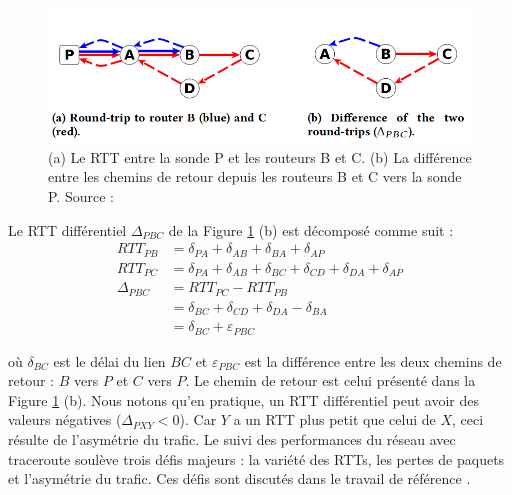 \begin{figure}[h]
	\centering
	\captionsetup{justification= centering}
	\includegraphics[width=0.7\linewidth]{illustrations/rtt-differ}
	\caption{(a) Le RTT entre la sonde P et les routeurs B et C. (b) La différence entre les  chemins de retour depuis les routeurs B et C vers la sonde P. Source : \cite{DBLP:journals/corr/FontugneAPB16}}
	\label{fig:rtt-differ}
\end{figure} 
Le RTT différentiel $ \Delta_{PBC} $ de la Figure 	\ref{fig:rtt-differ} (b) est décomposé comme suit :
\begin{align}
RTT_{PB} & =  \delta_{PA} + \delta_{AB} + \delta_{BA} + \delta_{AP} \nonumber\\
RTT_{PC} & = \delta_{PA} + \delta_{AB} + \delta_{BC} + \delta_{CD} + \delta_{DA}+ \delta_{AP} \nonumber\\
\Delta_{PBC} & = RTT_{PC} - RTT_{PB}  \label{eq:rttdifference}\\ 
& =  \delta_{BC} + \delta_{CD} + \delta_{DA}- \delta_{BA} \nonumber \\
& = \delta_{BC} + \varepsilon_{PBC} \label{eq:rttdiff}
\end{align}

où $\delta_{BC}$ est le délai du lien $BC$ et $\varepsilon_{PBC}$ est la différence entre les deux chemins de retour : $B$ vers $P$ et $C$ vers $P$.  Le chemin de retour est celui  présenté dans  la Figure \ref{fig:rtt-differ} (b). 
Nous notons qu'en pratique, un RTT différentiel peut avoir des valeurs négatives ($ \Delta_{PXY} < 0 $). Car $Y$ a un RTT plus petit que celui de $ X $, ceci résulte de l'asymétrie du trafic. 
Le suivi des performances du réseau avec traceroute soulève trois défis majeurs : la variété des RTTs, les pertes de paquets et l'asymétrie du trafic. Ces défis sont discutés dans le travail de référence \cite{DBLP:journals/corr/FontugneAPB16}.



